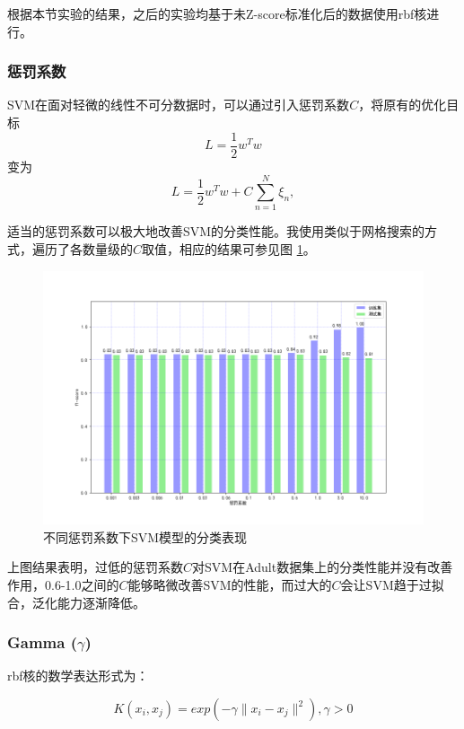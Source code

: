 \documentclass[12pt,a4paper]{article}
\theoremstyle{definition}
\begin{document}
\vspace{0.01\linewidth}
根据本节实验的结果，之后的实验均基于未Z-score标准化后的数据使用rbf核进行。

\subsubsection{惩罚系数}
\label{sec:penalty}

SVM在面对轻微的线性不可分数据时，可以通过引入惩罚系数$C$，将原有的优化目标
\begin{equation}
	L = \dfrac{1}{2}w^Tw
\end{equation}
变为
\begin{equation}
	L = \dfrac{1}{2}w^Tw+C\sum\limits_{n=1}^{N}\xi_n,
\end{equation}

\vspace{0.01\linewidth}
适当的惩罚系数可以极大地改善SVM的分类性能。我使用类似于网格搜索的方式，遍历了各数量级的$C$取值，相应的结果可参见图 \ref{fig:penalty}。

\begin{figure}[H]
	\centering
	\includegraphics[width=0.75\linewidth]{img/svm_penalty.png}
	\caption{不同惩罚系数下SVM模型的分类表现}
	\label{fig:penalty}
\end{figure}

上图结果表明，过低的惩罚系数$C$对SVM在Adult数据集上的分类性能并没有改善作用，0.6-1.0之间的$C$能够略微改善SVM的性能，而过大的$C$会让SVM趋于过拟合，泛化能力逐渐降低。

\subsubsection{Gamma ($\gamma$)}

rbf核的数学表达形式为：

\begin{equation}
	K(x_i, x_j)=exp(-\gamma\|x_i-x_j\|^2), \gamma>0
\end{equation}
\end{document}
